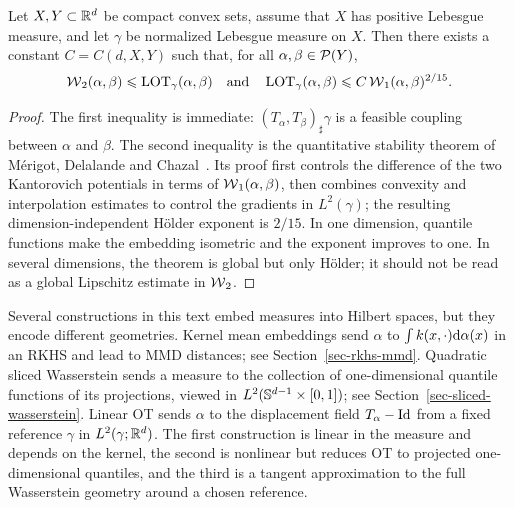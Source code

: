 \begin{prop}\label{prop-linear-ot-stability}
	Let $X,Y\subset\mathbb{R}^d$ be compact convex sets, assume that $X$ has positive Lebesgue measure, and let $\gamma$ be normalized Lebesgue measure on $X$. Then there exists a constant $C=C(d,X,Y)$ such that, for all $\alpha,\beta\in\mathcal{P}(Y)$,
	\[
		\operatorname{\mathcal{W}}_2(\alpha,\beta)\leqslant \operatorname{LOT}_\gamma(\alpha,\beta)
		\quad\text{and}\quad
		\operatorname{LOT}_\gamma(\alpha,\beta)
		\leqslant
		C\operatorname{\mathcal{W}}_1(\alpha,\beta)^{2/15}.
	\]
\end{prop}
\begin{proof}
	The first inequality is immediate: $(T_\alpha,T_\beta)_\sharp\gamma$ is a feasible coupling between $\alpha$ and $\beta$. The second inequality is the quantitative stability theorem of M\'erigot, Delalande and Chazal~\cite{merigot2020stability}. Its proof first controls the difference of the two Kantorovich potentials in terms of $\operatorname{\mathcal{W}}_1(\alpha,\beta)$, then combines convexity and interpolation estimates to control the gradients in $L^2(\gamma)$; the resulting dimension-independent H\"older exponent is $2/15$.
	In one dimension, quantile functions make the embedding isometric and the exponent improves to one. In several dimensions, the theorem is global but only H\"older; it should not be read as a global Lipschitz estimate in $\operatorname{\mathcal{W}}_2$.
\end{proof}

\begin{rem}\label{rem-three-hilbertian-measure-embeddings}
	Several constructions in this text embed measures into Hilbert spaces, but they encode different geometries. Kernel mean embeddings send $\alpha$ to $\int k(x,\cdot)\mathrm{d}\alpha(x)$ in an RKHS and lead to MMD distances; see Section~\ref{sec-rkhs-mmd}. Quadratic sliced Wasserstein sends a measure to the collection of one-dimensional quantile functions of its projections, viewed in $L^2(\mathbb{S}^{d-1}\times[0,1])$; see Section~\ref{sec-sliced-wasserstein}. Linear OT sends $\alpha$ to the displacement field $T_\alpha-\mathrm{Id}$ from a fixed reference $\gamma$ in $L^2(\gamma;\mathbb{R}^d)$. The first construction is linear in the measure and depends on the kernel, the second is nonlinear but reduces OT to projected one-dimensional quantiles, and the third is a tangent approximation to the full Wasserstein geometry around a chosen reference.
\end{rem}

